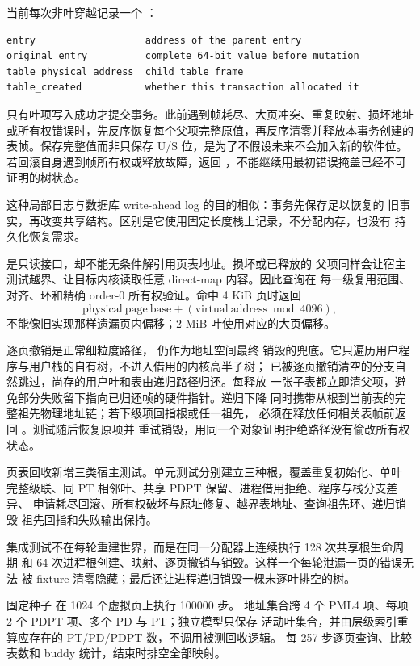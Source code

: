 当前每次非叶穿越记录一个 ：

\begin{verbatim}
entry                   address of the parent entry
original_entry          complete 64-bit value before mutation
table_physical_address  child table frame
table_created           whether this transaction allocated it
\end{verbatim}

只有叶项写入成功才提交事务。此前遇到帧耗尽、大页冲突、重复映射、损坏地址
或所有权错误时，先反序恢复每个父项完整原值，再反序清零并释放本事务创建的
表帧。保存完整值而非只保存 U/S 位，是为了不假设未来不会加入新的软件位。
若回滚自身遇到帧所有权或释放故障，返回
，不能继续用最初错误掩盖已经不可证明的树状态。

这种局部日志与数据库 write-ahead log 的目的相似：事务先保存足以恢复的
旧事实，再改变共享结构。区别是它使用固定长度栈上记录，不分配内存，也没有
持久化恢复需求。

 是只读接口，却不能无条件解引用页表地址。损坏或已释放的
父项同样会让宿主测试越界、让目标内核读取任意 direct-map 内容。因此查询在
每一级复用范围、对齐、环和精确 order-0 所有权验证。命中 4 KiB 页时返回
\[
  \mathrm{physical\ page\ base} + (\mathrm{virtual\ address}\bmod4096),
\]
不能像旧实现那样遗漏页内偏移；2 MiB 叶使用对应的大页偏移。

逐页撤销是正常细粒度路径， 仍作为地址空间最终
销毁的兜底。它只遍历用户程序与用户栈的自有树，不进入借用的内核高半子树；
已被逐页撤销清空的分支自然跳过，尚存的用户叶和表由递归路径归还。每释放
一张子表都立即清父项，避免部分失败留下指向已归还帧的硬件指针。递归下降
同时携带从根到当前表的完整祖先物理地址链；若下级项回指根或任一祖先，
必须在释放任何相关表帧前返回 。测试随后恢复原项并
重试销毁，用同一个对象证明拒绝路径没有偷改所有权状态。

页表回收新增三类宿主测试。单元测试分别建立三种根，覆盖重复初始化、单叶
完整级联、同 PT 相邻叶、共享 PDPT 保留、进程借用拒绝、程序与栈分支差异、
申请耗尽回滚、所有权破坏与原址修复、越界表地址、查询祖先环、递归销毁
祖先回指和失败输出保持。

集成测试不在每轮重建世界，而是在同一分配器上连续执行 128 次共享根生命周期
和 64 次进程根创建、映射、逐页撤销与销毁。这样一个每轮泄漏一页的错误无法
被 fixture 清零隐藏；最后还让进程递归销毁一棵未逐叶排空的树。

固定种子  在 1024 个虚拟页上执行 100000 步。
地址集合跨 4 个 PML4 项、每项 2 个 PDPT 项、多个 PD 与 PT；独立模型只保存
活动叶集合，并由层级索引重算应存在的 PT/PD/PDPT 数，不调用被测回收逻辑。
每 257 步逐页查询、比较表数和 buddy 统计，结束时排空全部映射。

